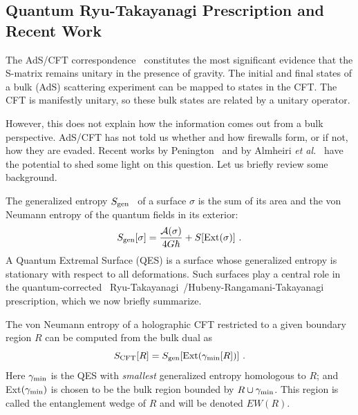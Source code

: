 \documentclass[12pt,letterpaper]{article}
\begin{document}
\subsection{Quantum Ryu-Takayanagi Prescription and Recent Work}

The AdS/CFT correspondence~\cite{Mal97} constitutes the most significant evidence that the S-matrix remains unitary in the presence of gravity. The initial and final states of a bulk (AdS) scattering experiment can be mapped to states in the CFT. The CFT is manifestly unitary, so these bulk states are related by a unitary operator.

However, this does not explain how the information comes out from a bulk perspective. AdS/CFT has not told us whether and how firewalls form, or if not, how they are evaded. Recent works by Penington~\cite{Pen19} and by Almheiri {\em et al.}~\cite{AEMM} have the potential to shed some light on this question. Let us briefly review some background.

The generalized entropy $S_{\rm gen}$~\cite{Bek72} of a surface $\sigma$ is the sum of its area and the von Neumann entropy of the quantum fields in its exterior:
\begin{equation}
  S_{\rm gen}[\sigma] =\frac{{\cal A}(\sigma)}{4G\hbar}+S[\mbox{Ext}(\sigma)]~.
\end{equation}
A Quantum Extremal Surface (QES) is a surface whose generalized entropy is stationary with respect to all deformations. Such surfaces play a central role in the quantum-corrected~\cite{FauLew13,EngWal14} Ryu-Takayanagi~\cite{RyuTak06}/Hubeny-Rangamani-Takayanagi~\cite{ HubRan07} prescription, which we now briefly summarize.

The von Neumann entropy of a holographic CFT restricted to a given boundary region $R$ can be computed from the bulk dual as
\begin{equation}
  S_{\rm CFT}[R] = S_{\rm gen}[\mbox{Ext}(\gamma_{\rm min}[R])]~.
  \label{eq-rt}
\end{equation}
Here $\gamma_{\rm min}$ is the QES with {\em smallest} generalized entropy homologous to $R$; and Ext$(\gamma_{\rm min})$ is chosen to be the bulk region bounded by $R\cup \gamma_{\rm min}$. This region is called the entanglement wedge of $R$ and will be denoted $EW(R)$. 
\end{document}
